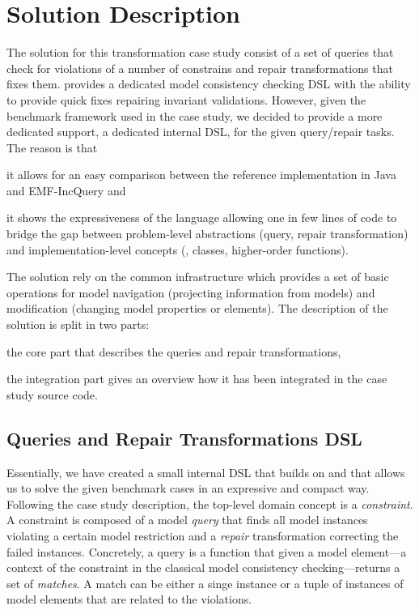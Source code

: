 

\section{Solution Description}
\label{sec:SolutionDescription}

The solution for this transformation case study consist of a set of queries that check for violations of a number of constrains and repair transformations that fixes them.
\SIGMA provides a dedicated model consistency checking DSL with the ability to provide quick fixes repairing invariant validations.
However, given the benchmark framework used in the case study, we decided to provide a more dedicated support, a dedicated internal DSL, for the given query/repair tasks.
The reason is that
\begin{inparaenum}[(1)]
  \item it allows for an easy comparison between the reference implementation in Java and EMF-IncQuery and
  \item it shows the expressiveness of the language allowing one in few lines of code to bridge the gap between problem-level abstractions (query, repair transformation) and implementation-level concepts (\Eg, classes, higher-order functions).
\end{inparaenum}

The solution rely on the \SIGMA common infrastructure which provides a set of basic operations for model navigation (\Ie projecting information from models) and modification (\Ie changing model properties or elements).
The description of the solution is split in two parts:
\begin{inparaenum}[(1)]
  \item the core part that describes the queries and repair transformations,
  \item the integration part gives an overview how it has been integrated in the case study source code.
\end{inparaenum}

\subsection{Queries and Repair Transformations DSL}

Essentially, we have created a small internal DSL that builds on \SIGMA and that allows us to solve the given benchmark cases in an expressive and compact way.
Following the case study description, the top-level domain concept is a \emph{constraint}.
A constraint is composed of a model \emph{query} that finds all model instances violating a certain model restriction and a \emph{repair} transformation correcting the failed instances.
Concretely, a query is a function that given a model element---\Ie a context of the constraint in the classical model consistency checking---returns a set of \emph{matches}.
A match can be either a singe instance or a tuple of instances of model elements that are related to the violations.

